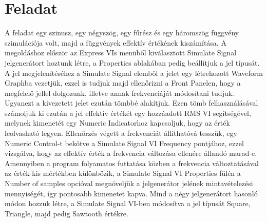 \documentclass[10pt, conference,a4paper]{ITKproc}
\begin{document}
\section{Feladat}
A feladat egy szinusz, egy négyszög, egy fűrész és egy háromszög függvény szimulációja volt, majd a függvények effektív értékének kiszámítása. A megoldáshoz először az Express VIs menüből kiválasztott Simulate Signal jelgenerátort hoztunk létre, a Properties ablakában pedig beállítjuk a jel típusát. A jel megjelenítéséhez a Simulate Signal elemből a jelet egy létrehozott Waveform Graphba vezetjük, ezzel is tudjuk majd ellenőrizni a Front Panelen, hogy a megfelelő jellel dolgozunk, illetve annak frekvenciáját módosítani tudjuk. Ugyanezt a kivezetett jelet ezután tömbbé alakítjuk. Ezen tömb felhasználásával számoljuk ki ezután a jel effektív értékét egy hozzáadott RMS VI segítségével, melynek kimenetét egy Numeric Indicatorhoz kapcsoljuk, hogy az érték leolvasható legyen. Ellenőrzés végett a frekvenciát állíthatóvá tesszük, egy Numeric Control-t bekötve a Simulate Signal VI Frequency pontjához, ezzel vizsgálva, hogy az effektív érték a frekvencia változása ellenére állandó marad-e. Amennyiben a program folyamatos futtatása közben a frekvencia változtatásával az érték kis mértékben különbözik, a Simulate Signal VI Properties fülén a Number of samples opcióval megnöveljük a jelgenerátor jelének mintavételezési mennyiségét, így pontosabb kimenetet kapva. Mind a négy jelgenerátort hasonló módon hozzuk létre, a Simulate Signal VI-ben módosítva a jel típusát Square, Triangle, majd pedig Sawtooth értékre. 









%


\end{document}
